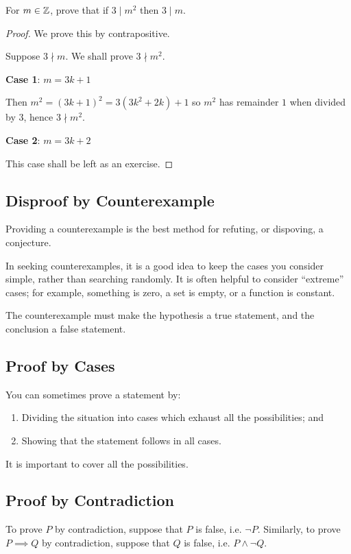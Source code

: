 \begin{exercise}{}{}
For $m\in\mathbb Z$, prove that if $3\mid m^2$ then $3\mid m$.
\end{exercise}
\begin{proof}
We prove this by contrapositive.

Suppose $3\nmid m$. We shall prove $3\nmid m^2$.

\textbf{Case 1}: $m=3k+1$

Then $m^2=(3k+1)^2=3(3k^2+2k)+1$ so $m^2$ has remainder $1$ when divided by $3$, hence $3\nmid m^2$.

\textbf{Case 2}: $m=3k+2$

This case shall be left as an exercise.
\end{proof}

\subsection{Disproof by Counterexample}
Providing a counterexample is the best method for refuting, or dispoving, a conjecture. 

In seeking counterexamples, it is a good idea to keep the cases you consider simple, rather than searching randomly. It is often helpful to consider ``extreme'' cases; for example, something is zero, a set is empty, or a function is constant.

The counterexample must make the hypothesis a true statement, and the conclusion a false statement.

\subsection{Proof by Cases}
You can sometimes prove a statement by:
\begin{enumerate}
\item Dividing the situation into cases which exhaust all the possibilities; and
\item Showing that the statement follows in all cases.
\end{enumerate}

\begin{remark}
It is important to cover all the possibilities.
\end{remark}

\subsection{Proof by Contradiction}
To prove $P$ by contradiction, suppose that $P$ is false, i.e. $\lnot P$. Similarly, to prove $P \implies Q$ by contradiction, suppose that $Q$ is false, i.e. $P\land\lnot Q$.

